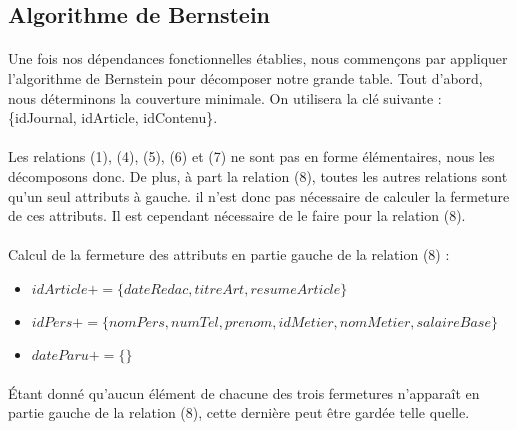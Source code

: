 \subsection{Algorithme de Bernstein}
\paragraph{}{Une fois nos dépendances fonctionnelles établies, nous commençons par appliquer l'algorithme de Bernstein pour décomposer notre grande table. Tout d'abord, nous déterminons la couverture minimale. On utilisera la clé suivante : \{idJournal, idArticle, idContenu\}. }

\paragraph{}{Les relations (1), (4), (5), (6) et (7) ne sont pas en forme élémentaires, nous les décomposons donc. De plus, à part la relation (8), toutes les autres relations sont qu'un seul attributs à gauche. il n'est donc pas nécessaire de calculer la fermeture de ces attributs. Il est cependant nécessaire de le faire pour la relation (8).}

\paragraph{}{Calcul de la fermeture des attributs en partie gauche de la relation (8) :
\begin{itemize}
\item $idArticle+ = \{dateRedac, titreArt, resumeArticle\}$ 
\item $idPers+ = \{nomPers, numTel, prenom, idMetier, nomMetier, salaireBase\}$
\item $dateParu+ = \{\}$
\end{itemize} }

\paragraph{}{Étant donné qu'aucun élément de chacune des trois fermetures n'apparaît en partie gauche de la relation (8), cette dernière peut être gardée telle quelle.}
